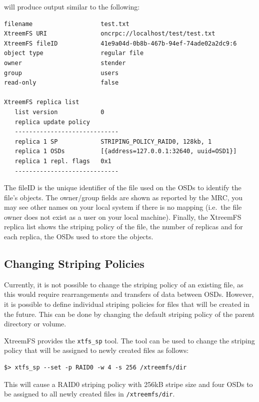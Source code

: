 \documentclass[a4paper,10pt]{book}
\begin{document}
will produce output similar to the following:


\begin{verbatim}
filename                   test.txt
XtreemFS URI               oncrpc://localhost/test/test.txt
XtreemFS fileID            41e9a04d-0b8b-467b-94ef-74ade02a2dc9:6
object type                regular file
owner                      stender
group                      users
read-only                  false

XtreemFS replica list
   list version            0
   replica update policy
   -----------------------------
   replica 1 SP            STRIPING_POLICY_RAID0, 128kb, 1
   replica 1 OSDs          [{address=127.0.0.1:32640, uuid=OSD1}]
   replica 1 repl. flags   0x1
   -----------------------------
\end{verbatim}


The fileID  is the unique identifier of the file used on the OSDs to identify the file's objects. The owner/group fields are shown as reported by the MRC, you may see other names on your local system if there is no mapping (i.e.\ the file owner does not exist as a user on your local machine).
Finally, the XtreemFS replica list shows the striping policy of the file, the number of replicas and for each replica, the OSDs used to store the objects.


\subsection{Changing Striping Policies}

Currently, it is not possible to change the striping policy of an existing file, as this would require rearrangements and transfers of data between OSDs. However, it is possible to define individual striping policies for files that will be created in the future. This can be done by changing the default striping policy of the parent directory or volume.

XtreemFS provides the \texttt{xtfs\_sp} tool. The tool can be used to change the striping policy that will be assigned to newly created files as follows:

\begin{verbatim}
$> xtfs_sp --set -p RAID0 -w 4 -s 256 /xtreemfs/dir
\end{verbatim}

This will cause a RAID0 striping policy with 256kB stripe size and four OSDs to be assigned to all newly created files in \texttt{/xtreemfs/dir}.
\end{document}
